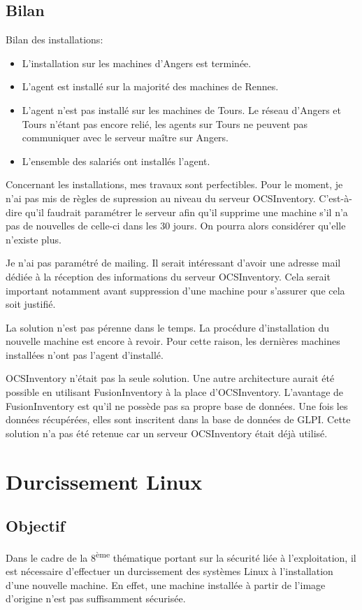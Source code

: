 \documentclass[12pt]{article}
\begin{document}
\newpage
\subsection{Bilan}

Bilan des installations: 
\begin{itemize}
    \item L'installation sur les machines d'Angers est terminée.
    \item L'agent est installé sur la majorité des machines de Rennes.
    \item L'agent n'est pas installé sur les machines de Tours. 
    Le réseau d'Angers et Tours n'étant pas encore relié, les agents sur Tours ne peuvent pas communiquer avec le serveur maître sur Angers.
    \item L'ensemble des salariés ont installés l'agent.
\end{itemize}

Concernant les installations, mes travaux sont perfectibles.
Pour le moment, je n'ai pas mis de règles de supression au niveau du serveur \gls{OCSInventory}.
C'est-à-dire qu'il faudrait paramétrer le serveur afin qu'il supprime une machine s'il n'a pas de nouvelles de celle-ci dans les 30 jours.
On pourra alors considérer qu'elle n'existe plus.

Je n'ai pas paramétré de mailing.
Il serait intéressant d'avoir une adresse mail dédiée à la réception des informations du serveur \gls{OCSInventory}.
Cela serait important notamment avant suppression d'une machine pour s'assurer que cela soit justifié.

La solution n'est pas pérenne dans le temps.
La procédure d'installation du nouvelle machine est encore à revoir.
Pour cette raison, les dernières machines installées n'ont pas l'agent d'installé.

\gls{OCSInventory} n'était pas la seule solution.
Une autre architecture aurait été possible en utilisant FusionInventory à la place d'\gls{OCSInventory}. 
L'avantage de FusionInventory est qu'il ne possède pas sa propre base de données. 
Une fois les données récupérées, elles sont inscritent dans la base de données de \gls{GLPI}. 
Cette solution n'a pas été retenue car un serveur \gls{OCSInventory} était déjà utilisé.

\newpage
\section{Durcissement Linux}
\subsection{Objectif}
Dans le cadre de la 8\textsuperscript{ème} thématique portant sur la sécurité liée à l'exploitation, il est nécessaire d'effectuer un durcissement des systèmes \gls{Linux} à l'installation d'une nouvelle machine. 
En effet, une machine installée à partir de l'image d'origine n'est pas suffisamment sécurisée.
\end{document}
